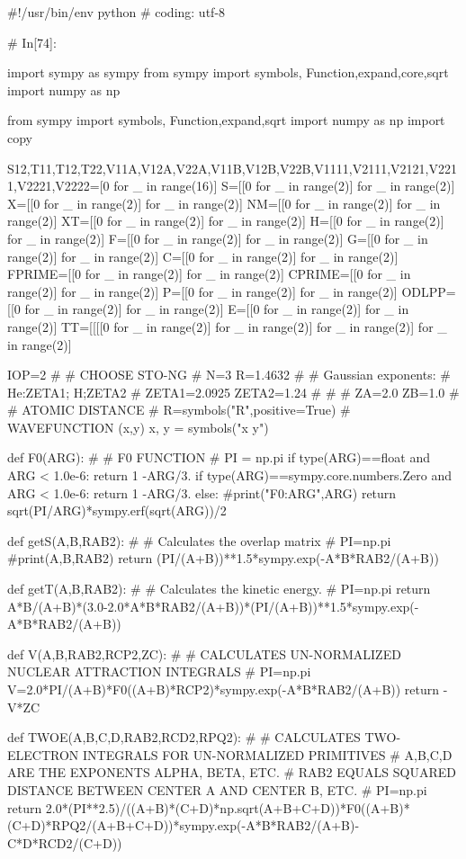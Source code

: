 #!/usr/bin/env python
# coding: utf-8

# In[74]:


import sympy as sympy
from sympy import symbols, Function,expand,core,sqrt
import numpy as np

from sympy import symbols, Function,expand,sqrt
import numpy as np
import copy

S12,T11,T12,T22,V11A,V12A,V22A,V11B,V12B,V22B,V1111,V2111,V2121,V2211,V2221,V2222=[0 for _ in range(16)]
S=[[0 for _ in range(2)] for _ in range(2)]
X=[[0 for _ in range(2)] for _  in range(2)]
NM=[[0 for _ in range(2)] for _  in range(2)]
XT=[[0 for _ in range(2)] for _ in  range(2)]
H=[[0 for _ in range(2)] for _ in  range(2)]
F=[[0 for _ in range(2)] for _ in  range(2)]
G=[[0 for _ in range(2)] for _ in  range(2)]
C=[[0 for _ in range(2)] for _ in  range(2)]
FPRIME=[[0 for _ in range(2)] for _  in range(2)]
CPRIME=[[0 for _ in range(2)] for _  in range(2)]
P=[[0 for _ in range(2)] for _  in range(2)]
ODLPP=[[0 for _ in range(2)] for _  in range(2)]
E=[[0 for _ in range(2)] for _  in range(2)]
TT=[[[[0 for _ in range(2)] for _  in range(2)] for _ in range(2)] for _ in range(2)]


IOP=2
#
# CHOOSE STO-NG
#
N=3
R=1.4632
#
# Gaussian exponents:
# He:ZETA1; H;ZETA2
#
ZETA1=2.0925
ZETA2=1.24
#
#
#
ZA=2.0
ZB=1.0
#
# ATOMIC DISTANCE 
#
R=symbols("R",positive=True)
# WAVEFUNCTION (x,y)
x, y = symbols("x y")


def F0(ARG):
#
# F0 FUNCTION
#
    PI = np.pi
    if  type(ARG)==float and ARG < 1.0e-6:
        return 1 -ARG/3.
    if  type(ARG)==sympy.core.numbers.Zero and ARG < 1.0e-6:
        return 1 -ARG/3.
    else:
        #print("F0:ARG",ARG)
        return sqrt(PI/ARG)*sympy.erf(sqrt(ARG))/2
    
def getS(A,B,RAB2):
#
# Calculates the overlap matrix
#   
    PI=np.pi
    #print(A,B,RAB2)
    return (PI/(A+B))**1.5*sympy.exp(-A*B*RAB2/(A+B))

def getT(A,B,RAB2):
#
# Calculates the kinetic energy.
#
    PI=np.pi
    return A*B/(A+B)*(3.0-2.0*A*B*RAB2/(A+B))*(PI/(A+B))**1.5*sympy.exp(-A*B*RAB2/(A+B))

def V(A,B,RAB2,RCP2,ZC):
#
#  CALCULATES UN-NORMALIZED NUCLEAR ATTRACTION INTEGRALS
#
    PI=np.pi
    V=2.0*PI/(A+B)*F0((A+B)*RCP2)*sympy.exp(-A*B*RAB2/(A+B))
    return -V*ZC

def TWOE(A,B,C,D,RAB2,RCD2,RPQ2):
#
# CALCULATES TWO-ELECTRON INTEGRALS FOR UN-NORMALIZED PRIMITIVES
# A,B,C,D ARE THE EXPONENTS ALPHA, BETA, ETC.
# RAB2 EQUALS SQUARED DISTANCE BETWEEN CENTER A AND CENTER B, ETC.
#
    PI=np.pi
    return 2.0*(PI**2.5)/((A+B)*(C+D)*np.sqrt(A+B+C+D))*F0((A+B)*(C+D)*RPQ2/(A+B+C+D))*sympy.exp(-A*B*RAB2/(A+B)-C*D*RCD2/(C+D))

